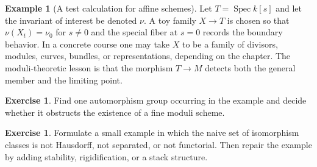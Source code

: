 \documentclass[11pt]{amsart}
\theoremstyle{definition}
\newtheorem{example}[theorem]{Example}
\newtheorem{exercise}[theorem]{Exercise}
\newcommand{\Spec}{\operatorname{Spec}}
\begin{document}
\begin{example}[A test calculation for affine schemes]
Let $T=\Spec k[s]$ and let the invariant of interest be denoted $\nu$.  A toy family $X\to T$ is chosen so that $\nu(X_t)=\nu_0$ for $s\ne0$ and the special fiber at $s=0$ records the boundary behavior.  In a concrete course one may take $X$ to be a family of divisors, modules, curves, bundles, or representations, depending on the chapter.  The moduli-theoretic lesson is that the morphism $T\to M$ detects both the general member and the limiting point.
\end{example}
\begin{exercise}
Find one automorphism group occurring in the example and decide whether it obstructs the existence of a fine moduli scheme.
\end{exercise}
\begin{exercise}
Formulate a small example in which the naive set of isomorphism classes is not Hausdorff, not separated, or not functorial.  Then repair the example by adding stability, rigidification, or a stack structure.
\end{exercise}
\clearpage
\end{document}
